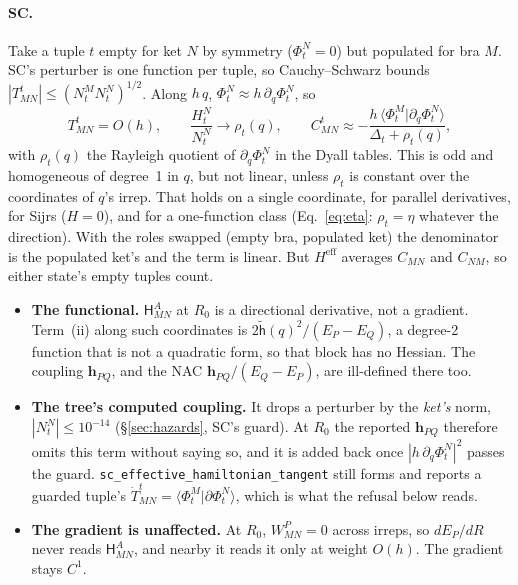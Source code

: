 \documentclass[11pt]{article}
\newcommand{\code}[1]{\texttt{#1}}
\newcommand{\Heff}{H^{\mathrm{eff}}}
\begin{document}
\paragraph{SC.} Take a tuple $t$ empty for ket $N$ by symmetry ($\Phi^N_t
= 0$) but populated for bra $M$. SC's perturber is one function per
tuple, so Cauchy--Schwarz bounds $|T^t_{MN}| \le (N^M_tN^N_t)^{1/2}$. Along
$h\,q$, $\Phi^N_t \approx h\,\partial_q\Phi^N_t$, so
\begin{equation}
  T^t_{MN} = O(h),\qquad
  \frac{H^N_t}{N^N_t} \to \rho_t(q),\qquad
  C^t_{MN} \approx -\frac{h\,\langle\Phi^M_t|\partial_q\Phi^N_t\rangle}{\Delta_t + \rho_t(q)},
  \label{eq:qd-scfail}
\end{equation}
with $\rho_t(q)$ the Rayleigh quotient of $\partial_q\Phi^N_t$ in the
Dyall tables. This is odd and homogeneous of degree~1 in $q$, but not
linear, unless $\rho_t$ is constant over the coordinates of $q$'s irrep.
That holds on a single coordinate, for parallel derivatives, for Sijrs
($H = 0$), and for a one-function class (Eq.~\eqref{eq:eta}: $\rho_t =
\eta$ whatever the direction). With the roles swapped (empty bra, populated
ket) the denominator is the populated ket's and the term is linear. But
$\Heff$ averages $C_{MN}$ and $C_{NM}$, so either state's empty tuples
count.
\begin{itemize}
\item \textbf{The functional.} $\mathsf H^A_{MN}$ at $R_0$ is a
  directional derivative, not a gradient. Term~(ii) along such
  coordinates is $2\tilde{\mathsf h}(q)^2/(E_P - E_Q)$, a degree-2
  function that is not a quadratic form, so that block has no Hessian.
  The coupling $\mathbf h_{PQ}$, and the NAC $\mathbf h_{PQ}/(E_Q - E_P)$,
  are ill-defined there too.
\item \textbf{The tree's computed coupling.} It drops a perturber by the
  \emph{ket's} norm, $|N^N_t| \le 10^{-14}$ (\S\ref{sec:hazards}, SC's
  guard). At $R_0$ the reported $\mathbf h_{PQ}$ therefore omits this term
  without saying so, and it is added back once $|h\,\partial_q\Phi^N_t|^2$
  passes the guard. \code{sc\_effective\_hamiltonian\_tangent} still forms
  and reports a guarded tuple's $\dot T^t_{MN} =
  \langle\Phi^M_t|\partial\Phi^N_t\rangle$, which is what the refusal
  below reads.
\item \textbf{The gradient is unaffected.} At $R_0$, $W^P_{MN} = 0$
  across irreps, so $dE_P/dR$ never reads $\mathsf H^A_{MN}$, and nearby
  it reads it only at weight $O(h)$. The gradient stays $C^1$.
\end{itemize}
\end{document}
